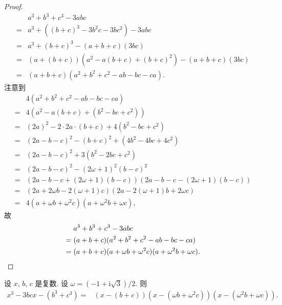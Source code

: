 \documentclass[%
    UTF8,%
    fontset=none,%
    punct=kaiming,%
    zihao=-4,%
    a4paper,%
    oneside,%
]{ctexbook}
\begin{document}
\begin{proof}
    \begin{align*}
             & a^3 + b^3 + c^3 - 3abc                       \\
        = {} & a^3 + ((b + c)^3 - 3b^2 c - 3bc^2) - 3abc    \\
        = {} & a^3 + (b + c)^3 - (a + b + c)(3bc)           \\
        = {} & (a + (b + c))(a^2 - a(b + c) + (b + c)^2)
        - (a + b + c)(3bc)                                  \\
        = {} & (a + b + c)(a^2 + b^2 + c^2 - ab - bc - ca).
    \end{align*}
    注意到
    \begin{align*}
             & 4(a^2 + b^2 + c^2 - ab - bc - ca)          \\
        = {} & 4(a^2  - a(b + c) + (b^2 - bc + c^2))      \\
        = {} & (2a)^2 - 2 \cdot 2a \cdot (b + c)
        + 4(b^2 - bc + c^2)                               \\
        = {} & (2a - b - c)^2 - (b + c)^2
        + (4b^2 - 4bc + 4c^2)                             \\
        = {} & (2a - b - c)^2 + 3(b^2 - 2bc + c^2)        \\
        = {} & (2a - b - c)^2 - (2\omega + 1)^2 (b - c)^2 \\
        = {} & (2a - b - c + (2\omega + 1)(b - c))
        (2a - b - c - (2\omega + 1)(b - c))               \\
        = {} & (2a + 2\omega b - 2(\omega + 1) c)
        (2a - 2(\omega + 1) b + 2\omega c)                \\
        = {} & 4(a + \omega b + \omega^2 c)
        (a + \omega^2 b + \omega c),
    \end{align*}
    故
    \begin{align*}
             & a^3 + b^3 + c^3 - 3abc                      \\
        = {} & (a + b + c)(a^2 + b^2 + c^2 - ab - bc - ca) \\
        = {} & (a + b + c)(a + \omega b + \omega^2 c)
        (a + \omega^2 b + \omega c).
        \qedhere
    \end{align*}
\end{proof}

\begin{theorem}
    设 \(x\), \(b\), \(c\) 是复数.
    设 \(\omega = (-1 + \mathrm{i} \sqrt{3})/2\).
    则
    \begin{align*}
        x^3 - 3bcx - (b^3 + c^3)
        = {} & (x - (b + c))(x - (\omega b + \omega^2 c))
        (x - (\omega^2 b + \omega c)).
    \end{align*}
\end{theorem}
\end{document}
